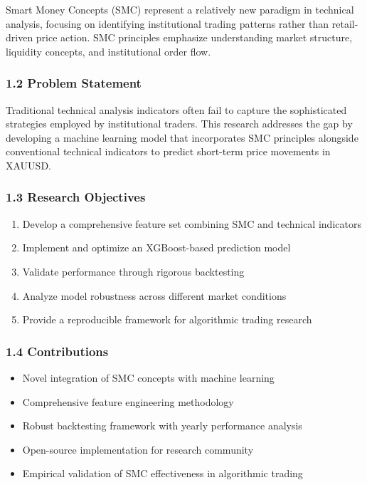 Smart Money Concepts (SMC) represent a relatively new paradigm in
technical analysis, focusing on identifying institutional trading
patterns rather than retail-driven price action. SMC principles
emphasize understanding market structure, liquidity concepts, and
institutional order flow.

\subsubsection{1.2 Problem Statement}\label{problem-statement}

Traditional technical analysis indicators often fail to capture the
sophisticated strategies employed by institutional traders. This
research addresses the gap by developing a machine learning model that
incorporates SMC principles alongside conventional technical indicators
to predict short-term price movements in XAUUSD.

\subsubsection{1.3 Research Objectives}\label{research-objectives}

\begin{enumerate}
\def\labelenumi{\arabic{enumi}.}
\tightlist
\item
  Develop a comprehensive feature set combining SMC and technical
  indicators
\item
  Implement and optimize an XGBoost-based prediction model
\item
  Validate performance through rigorous backtesting
\item
  Analyze model robustness across different market conditions
\item
  Provide a reproducible framework for algorithmic trading research
\end{enumerate}

\subsubsection{1.4 Contributions}\label{contributions}

\begin{itemize}
\tightlist
\item
  Novel integration of SMC concepts with machine learning
\item
  Comprehensive feature engineering methodology
\item
  Robust backtesting framework with yearly performance analysis
\item
  Open-source implementation for research community
\item
  Empirical validation of SMC effectiveness in algorithmic trading
\end{itemize}

